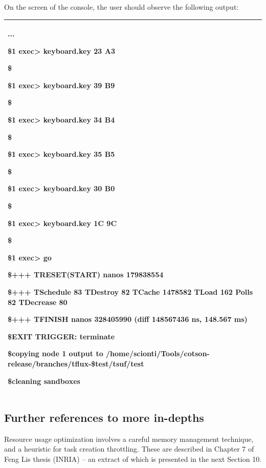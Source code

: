 \documentclass[a4paper]{article}
\begin{document}
{
On the screen of the console, the user should observe the following
output:}

\begin{flushleft}
\tablehead{}
\begin{supertabular}{|m{6.34626in}|}
\hline
{\ttfamily ...}

{\ttfamily \$1 exec{\textgreater}
keyboard.key 23 A3}

{\ttfamily \$}

{\ttfamily \$1 exec{\textgreater}
keyboard.key 39 B9}

{\ttfamily \$}

{\ttfamily \$1 exec{\textgreater}
keyboard.key 34 B4}

{\ttfamily \$}

{\ttfamily \$1 exec{\textgreater}
keyboard.key 35 B5}

{\ttfamily \$}

{\ttfamily \$1 exec{\textgreater}
keyboard.key 30 B0}

{\ttfamily \$}

{\ttfamily \$1 exec{\textgreater}
keyboard.key 1C 9C}

{\ttfamily \$}

{\ttfamily \$1 exec{\textgreater}
go}

{\ttfamily \$+++ TRESET(START)
nanos 179838554}

{\ttfamily \$+++ TSchedule 83
TDestroy 82 TCache 1478582 TLoad 162 Polls 82 TDecrease 80}

{\ttfamily \$+++ TFINISH nanos
328405990 (diff 148567436 ns, 148.567 ms)}

{\ttfamily \$EXIT TRIGGER:
terminate}

{\ttfamily \$copying node 1 output
to /home/scionti/Tools/cotson-release/branches/tflux-\$test/tsuf/test}

\ttfamily \$cleaning
sandboxes\\\hline
\end{supertabular}
\end{flushleft}
\subsection[Further references to more in{}-depths]{Further references
to more in-depths}
{
Resource usage optimization involves a careful memory management
technique, and a heuristic for task creation throttling. These are
described in Chapter 7 of Feng Li{\textquotesingle}s thesis (INRIA) --
an extract of which is presented in the next Section 10. }
\end{document}
